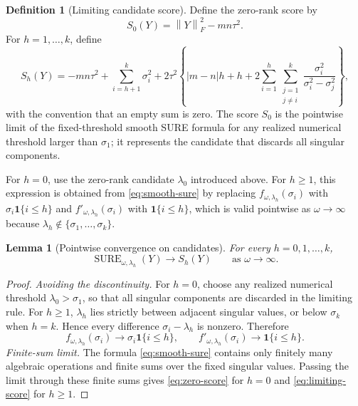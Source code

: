 \documentclass[12pt,reqno]{amsart}
\numberwithin{equation}{section}
\theoremstyle{plain}
\newtheorem{lemma}[theorem]{Lemma}
\theoremstyle{definition}
\newtheorem{definition}[theorem]{Definition}
\newcommand{\ind}{\mathbf{1}}
\newcommand{\norm}[1]{\left\lVert #1\right\rVert}
\begin{document}
\begin{definition}[Limiting candidate score]\label{def:limiting-score}
Define the zero-rank score by
\begin{equation}\label{eq:zero-score}
    S_0(Y)=\norm{Y}_F^2-mn\tau^2.
\end{equation}
For $h=1,\ldots,k$, define
\begin{equation}\label{eq:limiting-score}
    S_h(Y)
    =-mn\tau^2+
    \sum_{i=h+1}^{k}\sigma_i^2
    +2\tau^2\left\{|m-n|h+h
    +2\sum_{i=1}^{h}\sum_{\substack{j=1\\j\neq i}}^{k}
        \frac{\sigma_i^2}{\sigma_i^2-\sigma_j^2}
    \right\},
\end{equation}
with the convention that an empty sum is zero. The score $S_0$ is the pointwise limit of the fixed-threshold smooth SURE formula for any realized numerical threshold larger than $\sigma_1$; it represents the candidate that discards all singular components.
\end{definition}

For $h=0$, use the zero-rank candidate $\lambda_0$ introduced above. For $h\geq1$, this expression is obtained from \eqref{eq:smooth-sure} by replacing $f_{\omega,\lambda_h}(\sigma_i)$ with $\sigma_i\ind\{i\leq h\}$ and $f'_{\omega,\lambda_h}(\sigma_i)$ with $\ind\{i\leq h\}$, which is valid pointwise as $\omega\to\infty$ because $\lambda_h\notin\{\sigma_1,\ldots,\sigma_k\}$.

\begin{lemma}[Pointwise convergence on candidates]\label{lem:pointwise}
For every $h=0,1,\ldots,k$,
\begin{equation}
    \operatorname{SURE}_{\omega,
    \lambda_h}(Y)\longrightarrow S_h(Y)
    \qquad\text{as }\omega\to\infty.
\end{equation}
\end{lemma}

\begin{proof}
\emph{Avoiding the discontinuity.} For $h=0$, choose any realized numerical threshold $\lambda_0>\sigma_1$, so that all singular components are discarded in the limiting rule. For $h\geq1$, $\lambda_h$ lies strictly between adjacent singular values, or below $\sigma_k$ when $h=k$. Hence every difference $\sigma_i-\lambda_h$ is nonzero. Therefore
\begin{equation}
    f_{\omega,\lambda_h}(\sigma_i)\to \sigma_i\ind\{i\leq h\},
    \qquad
    f'_{\omega,\lambda_h}(\sigma_i)\to \ind\{i\leq h\}.
\end{equation}
\emph{Finite-sum limit.} The formula \eqref{eq:smooth-sure} contains only finitely many algebraic operations and finite sums over the fixed singular values. Passing the limit through these finite sums gives \eqref{eq:zero-score} for $h=0$ and \eqref{eq:limiting-score} for $h\geq1$.
\end{proof}
\end{document}
